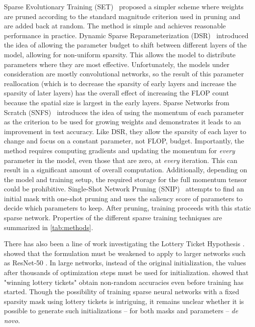 \documentclass{article}
\begin{document}
Sparse Evolutionary Training (SET)~\citep{Mocanu2018} proposed a simpler scheme where weights are pruned according to the standard magnitude criterion used in pruning and are added back at random. The method is simple and achieves reasonable performance in practice.  Dynamic Sparse Reparameterization (DSR)~\citep{Mostafa2019} introduced the idea of allowing the parameter budget to shift between different layers of the model, allowing for non-uniform sparsity. This allows the model to distribute parameters where they are most effective. Unfortunately, the models under consideration are mostly convolutional networks, so the result of this parameter reallocation (which is to decrease the sparsity of early layers and increase the sparsity of later layers) has the overall effect of increasing the FLOP count because the spatial size is largest in the early layers. Sparse Networks from Scratch (SNFS)~\citep{dettmers2019} introduces the idea of using the momentum of each parameter as the criterion to be used for growing weights and demonstrates it leads to an improvement in test accuracy. Like DSR, they allow the sparsity of each layer to change and focus on a constant parameter, not FLOP, budget. Importantly, the method requires computing gradients and updating the momentum for \emph{every} parameter in the model, even those that are zero, at \emph{every} iteration. This can result in a significant amount of overall computation. Additionally, depending on the model and training setup, the required storage for the full momentum tensor could be prohibitive. Single-Shot Network Pruning (SNIP)~\citep{SNIP} attempts to find an initial mask with one-shot pruning and uses the saliency score of parameters to decide which parameters to keep. After pruning, training proceeds with this static sparse network. Properties of the different sparse training techniques are summarized in \autoref{tab:methods}.

There has also been a line of work investigating the Lottery Ticket Hypothesis \citep{frankle2018}. \citet{frankle2019} showed that the formulation must be weakened to apply to larger networks such as ResNet-50 \citep{He2015}. In large networks, instead of the original initialization, the values after thousands of optimization steps must be used for initialization. \cite{deconstructing_lottery} showed that "winning lottery tickets" obtain non-random accuracies even before training has started. Though the possibility of training sparse neural networks with a fixed sparsity mask using lottery tickets is intriguing, it remains unclear whether it is possible to generate such initializations -- for both masks and parameters -- \emph{de novo}.
\end{document}
